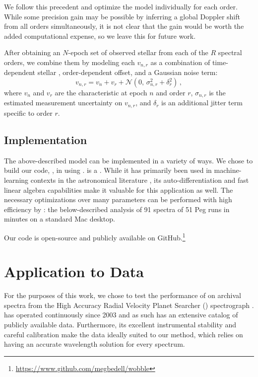 \documentclass[modern]{aastex62}
\begin{document}
We follow this precedent and optimize the \wobble model individually for each order. 
While some \RV precision gain may be possible by inferring a global Doppler shift from all orders simultaneously, it is not clear that the gain would be worth the added computational expense, so we leave this for future work. 

After obtaining an $N$-epoch set of observed stellar \RVs from each of the $R$ spectral orders, we combine them by modeling each \RV $v_{n,r}$ as a combination of time-dependent stellar \RV, order-dependent \RV offset, and a Gaussian noise term:
\begin{equation}
v_{n,r} = v_n + v_r + \mathcal{N}(0,\,\sigma_{n,r}^{2} + \delta_r^2 )\,,
\end{equation}
where $v_n$ and $v_r$ are the characteristic \RVs at epoch $n$ and order $r$, $\sigma_{n,r}$ is the estimated measurement uncertainty on $v_{n,r}$, and $\delta_r$ is an additional jitter term specific to order $r$. 


\subsection{Implementation}
\label{s:implementation}

The above-described model can be implemented in a variety of ways. We chose to build our code, \wobble, in  using \TF. 
\TF is a . 
While it has primarily been used in machine-learning contexts in the astronomical literature , its auto-differentiation and fast linear algebra capabilities make it valuable for this application as well. 
The necessary optimizations over many parameters can be performed with high efficiency by \TF: the below-described analysis of 91 spectra of 51 Peg runs in  minutes on a standard Mac desktop.


Our code is open-source and publicly available on GitHub.\footnote{\url{https://www.github.com/megbedell/wobble}}



\section{Application to \HARPS Data}
\label{s:results}

For the purposes of this work, we chose to test the performance of \wobble on archival spectra from the High Accuracy Radial Velocity Planet Searcher (\HARPS) spectrograph \citep{Mayor2003}. 
\HARPS has operated continuously since 2003 and as such has an extensive catalog of publicly available data. 
Furthermore, its excellent instrumental stability and careful calibration make the data ideally suited to our method, which relies on having an accurate wavelength solution for every spectrum. 
\end{document}
